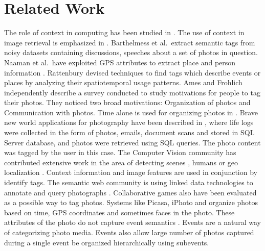 \chapter{Related Work}

The role of context in computing has been studied in \cite{chen2000survey}. The use of context in image retrieval is emphasized in \cite{jain2010content, datta2008image}. Barthelmess et al.\ extract semantic tags from noisy datasets containing discussions, speeches about a set of photos in question\cite{barthelmess2007toward}. Naaman et al.\ have exploited GPS attributes to extract place and person information \cite{naaman2005leveraging, naaman2005identity}. Rattenbury \cite{rattenbury2009methods} devised techniques to find tags which describe events or places by analyzing their spatiotemporal usage patterns. Ames and Frohlich \cite{ames2007we, frohlich2002requirements} independently describe a survey conducted to study motivations for people to tag their photos. They noticed two broad motivations: Organization of photos and Communication with photos. Time alone is used for organizing photos in \cite{graham2002time, hailpern2011youpivot}. Brave new world applications for photography have been described in \cite{gemmell2002mylifebits, dumais2003stuff}, where life logs were collected in the form of photos, emails, document scans and stored in SQL Server database, and photos were retrieved using SQL queries. The photo content was tagged by the user in this case. The Computer Vision community has contributed extensive work in the area of detecting scenes \cite{xiao2010sun}, humans \cite{dalal2005histograms} or geo localization \cite{hays2008im2gps}. Context information and image features are used in conjunction by \cite{o2009context, cao2008annotating, boutell2005beyond, cao2008eventscene} identify tags. The semantic web community is using linked data technologies to annotate and query photographs \cite{monaghan2006automating, nowack2006confoto}. Collaborative games also have been evaluated as a possible way to tag photos\cite{diakopoulos2007photoplay}. Systems like Picasa, iPhoto and \cite{graham2002time} organize photos based on time, GPS coordinates and sometimes faces in the photo. These attributes of the photo do not capture event semantics \cite{sawant2011automatic}. Events are a natural way of categorizing photo media. Events also allow large number of photos captured during a single event be organized hierarchically using subevents.